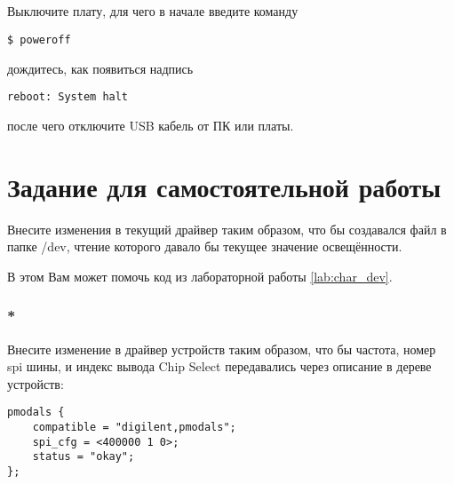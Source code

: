 \subsection{} Выключите плату, для чего в начале введите команду
\begin{lstlisting}[style=bash]
	$ poweroff
\end{lstlisting}
дождитесь, как появиться надпись
\begin{lstlisting}[style=stdout]
	reboot: System halt
\end{lstlisting}
после чего отключите USB кабель от ПК или платы. 

\section{Задание для самостоятельной работы}
Внесите изменения в текущий драйвер таким образом, что бы создавался файл в папке /dev, чтение которого давало бы текущее значение освещённости.

В этом Вам может помочь код из лабораторной работы \ref{lab:char_dev}.

\subsubsection{*}
Внесите изменение в драйвер устройств таким образом, что бы частота, номер spi шины, и индекс вывода Chip Select передавались через описание в дереве устройств:
\begin{lstlisting}[style=stdout]
pmodals {
	compatible = "digilent,pmodals";
	spi_cfg = <400000 1 0>;	  
	status = "okay";
};
\end{lstlisting}